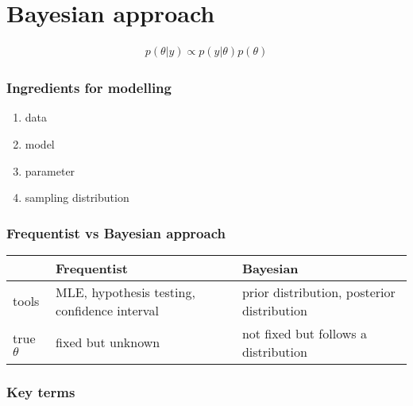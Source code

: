     \section{Bayesian approach}
    \begin{align*}
        p(\theta|y)\propto p(y|\theta)p(\theta)
    \end{align*}

    \subsubsection{Ingredients for modelling}
    \begin{enumerate}
        \item data
        \item model
        \item parameter
        \item sampling distribution
    \end{enumerate}

    \subsubsection{Frequentist vs Bayesian approach}
    \begin{tabulary}{\linewidth}{| L | L | L|}
        \hline
        & Frequentist & Bayesian\\
        \hline
        \hline
        tools & MLE, hypothesis testing, confidence interval
              & prior distribution, posterior distribution\\
              \hline
        true $\theta$ & fixed but unknown
                      & not fixed but follows a
                      distribution\\
                      \hline
    \end{tabulary}

    \subsubsection{Key terms}

